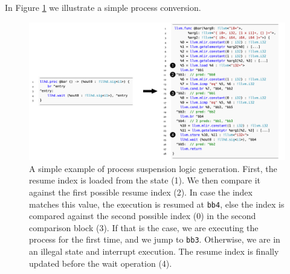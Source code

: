 In Figure \ref{fig:proclow} we illustrate a simple process conversion.

\begin{figure}[ht]
    \centering
    \includegraphics[width=1.1\textwidth]{gfx/ProcConv.png}
    \caption[A simple example of process suspension logic generation.]{A simple example of process suspension logic generation. First, the resume index is loaded from the state (1). We then compare it against the first possible resume index (2). In case the index matches this value, the execution is resumed at \texttt{bb4}, else the index is compared against the second possible index (\ie $0$) in the second comparison block (3). If that is the case, we are executing the process for the first time, and we jump to \texttt{bb3}. Otherwise, we are in an illegal state and interrupt execution. The resume index is finally updated before the wait operation (4).}
    \label{fig:proclow}
\end{figure}


